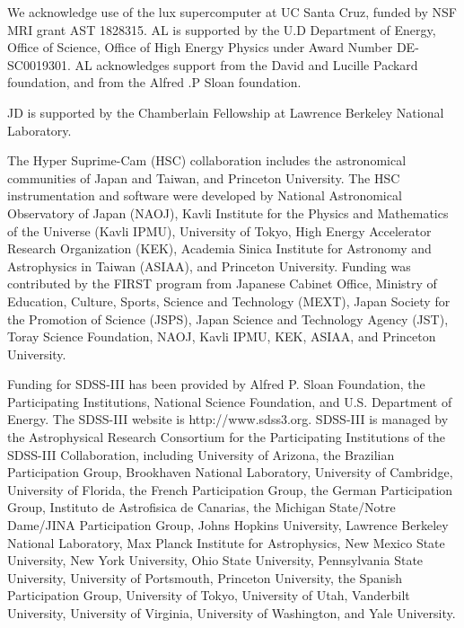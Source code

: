 \documentclass[fleqn,usenatbib,useAMS]{mnras}
\begin{document}
\begin{CJK*}{UTF8}{gbsn}
  We acknowledge use of the lux supercomputer at UC Santa Cruz, funded by NSF MRI grant AST
  1828315. AL is supported by the U.D Department of Energy, Office of Science, Office of High
  Energy Physics under Award Number DE-SC0019301. AL acknowledges support from the David and
  Lucille Packard foundation, and from the Alfred .P Sloan foundation.
  
  JD is supported by the Chamberlain Fellowship at Lawrence Berkeley National Laboratory.
  
  The Hyper Suprime-Cam (HSC) collaboration includes the astronomical communities of
  Japan and Taiwan, and Princeton University.  The HSC instrumentation and software were
  developed by National Astronomical Observatory of Japan (NAOJ), Kavli Institute
  for the Physics and Mathematics of the Universe (Kavli IPMU), University of Tokyo,
  High Energy Accelerator Research Organization (KEK), Academia Sinica Institute
  for Astronomy and Astrophysics in Taiwan (ASIAA), and Princeton University.
  Funding was contributed by the FIRST program from Japanese Cabinet Office,  Ministry
  of Education, Culture, Sports, Science and Technology (MEXT), Japan Society for
  the Promotion of Science (JSPS), Japan Science and Technology Agency (JST), Toray
  Science Foundation, NAOJ, Kavli IPMU, KEK, ASIAA, and Princeton University.

  Funding for SDSS-III has been provided by Alfred P. Sloan Foundation, the
  Participating Institutions, National Science Foundation, and U.S. Department of
  Energy. The SDSS-III website is http://www.sdss3.org.  SDSS-III is managed by the
  Astrophysical Research Consortium for the Participating Institutions of the SDSS-III
  Collaboration, including University of Arizona, the Brazilian Participation Group,
  Brookhaven National Laboratory, University of Cambridge, University of Florida, the
  French Participation Group, the German Participation Group, Instituto de Astrofisica
  de Canarias, the Michigan State/Notre Dame/JINA Participation Group, Johns Hopkins
  University, Lawrence Berkeley National Laboratory, Max Planck Institute for
  Astrophysics, New Mexico State University, New York University, Ohio State University,
  Pennsylvania State University, University of Portsmouth, Princeton University, the
  Spanish Participation Group, University of Tokyo, University of Utah, Vanderbilt
  University, University of Virginia, University of Washington, and Yale University.


\end{CJK*}
\end{document}
